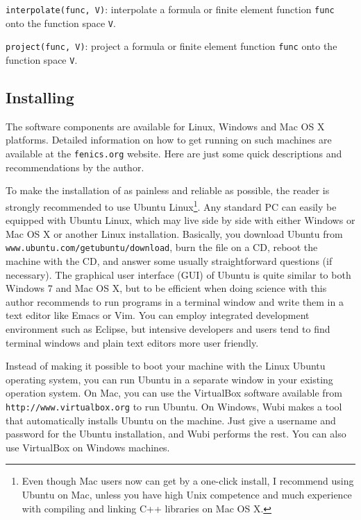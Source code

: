 {\fontsize{10pt}{10pt}\texttt{interpolate(func, V)}}: interpolate a formula or finite
element function {\fontsize{10pt}{10pt}\texttt{func}}
onto the function space {\fontsize{10pt}{10pt}\texttt{V}}.\gln

{\fontsize{10pt}{10pt}\texttt{project(func, V)}}: project a formula or finite element function {\fontsize{10pt}{10pt}\texttt{func}}
onto the function space {\fontsize{10pt}{10pt}\texttt{V}}.\gln



\subsection{Installing \fenics}
\label{langtangen:app:install}
\label{installing FEniCS}

The \fenics{} software components are available for Linux, Windows and Mac OS
X platforms. Detailed information on how to get \fenics{} running on such
machines are available at the {\fontsize{10pt}{10pt}\texttt{fenics.org}} website.
Here are just some quick descriptions and recommendations by the author.

To make the installation of \fenics{} as painless and reliable as
possible, the reader is strongly recommended to use Ubuntu Linux\footnote{Even though Mac users now can get \fenics{} by a one-click install, I recommend using Ubuntu on Mac, unless you have high Unix competence and much experience with compiling and linking C++ libraries on Mac OS X.}. Any
standard PC can easily be equipped with Ubuntu Linux, which may live
side by side with either Windows or Mac OS X or another Linux
installation.  Basically, you download
Ubuntu from {\fontsize{10pt}{10pt}\verb!www.ubuntu.com/getubuntu/download!}, burn the file on
a CD, reboot the machine with the CD, and answer some usually
straightforward questions (if necessary). The graphical user interface
(GUI) of Ubuntu is quite similar to
both Windows 7 and Mac OS X, but to be efficient when doing science
with \fenics{} this author recommends to run programs in a terminal
window and write them in a text editor like Emacs or Vim. You can
employ integrated development environment such as Eclipse, but
intensive \fenics{} developers and users tend to find terminal windows
and plain text editors more user friendly.

Instead of making it possible to boot your machine with the Linux
Ubuntu operating system, you can run Ubuntu in a separate window in
your existing operation system. On Mac, you can use the VirtualBox
software available
from {\fontsize{10pt}{10pt}\texttt{http://www.virtualbox.org}} to run Ubuntu.  On Windows, Wubi
makes a tool that automatically installs Ubuntu on the machine. Just
give a username and password for the Ubuntu installation, and Wubi
performs the rest. You can also use VirtualBox on Windows machines.

